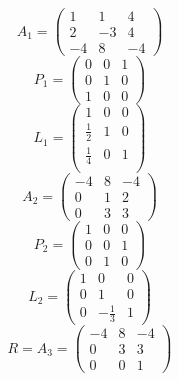 \documentclass[10pt,a4paper]{article}
\begin{document}
\begin{equation}
  A_{1} = \begin{pmatrix}
    1 & 1 & 4\\
    2 & -3 & 4\\
    -4 & 8 & -4
  \end{pmatrix}
\end{equation}
\begin{equation}
  P_{1} = \begin{pmatrix}
    0 & 0 & 1\\
    0 & 1 & 0\\
    1 & 0 & 0
  \end{pmatrix}
\end{equation}
\begin{equation}
  L_{1} = \begin{pmatrix}
    1 & 0 & 0\\
    \frac{1}{2} & 1 & 0\\
    \frac{1}{4} & 0 & 1\\
  \end{pmatrix}
\end{equation}
\begin{equation}
  A_{2} = \begin{pmatrix}
    -4 & 8 & -4\\
    0 & 1 & 2\\
    0 & 3 & 3
  \end{pmatrix}
\end{equation}
\begin{equation}
  P_{2} = \begin{pmatrix}
    1 & 0 & 0\\
    0 & 0 & 1\\
    0 & 1 & 0
  \end{pmatrix}
\end{equation}
\begin{equation}
  L_{2} = \begin{pmatrix}
    1 & 0 & 0\\
    0 & 1 & 0\\
    0 & -\frac{1}{3} & 1
  \end{pmatrix}
\end{equation}
\begin{equation}
  R = A_{3} = \begin{pmatrix}
    -4 & 8 & -4\\
    0 & 3 & 3\\
    0 & 0 & 1
  \end{pmatrix}
\end{equation}
\end{document}
